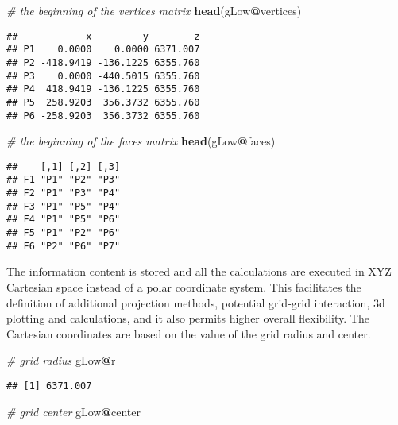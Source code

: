 \documentclass[]{article}
\newenvironment{Shaded}{\begin{snugshade}}{\end{snugshade}}
\newcommand{\KeywordTok}[1]{\textcolor[rgb]{0.13,0.29,0.53}{\textbf{#1}}}
\newcommand{\CommentTok}[1]{\textcolor[rgb]{0.56,0.35,0.01}{\textit{#1}}}
\newcommand{\OperatorTok}[1]{\textcolor[rgb]{0.81,0.36,0.00}{\textbf{#1}}}
\newcommand{\NormalTok}[1]{#1}
\begin{document}
\begin{Shaded}
\begin{Highlighting}[]
\CommentTok{# the beginning of the vertices matrix}
\KeywordTok{head}\NormalTok{(gLow}\OperatorTok{@}\NormalTok{vertices)}
\end{Highlighting}
\end{Shaded}

\begin{verbatim}
##            x         y        z
## P1    0.0000    0.0000 6371.007
## P2 -418.9419 -136.1225 6355.760
## P3    0.0000 -440.5015 6355.760
## P4  418.9419 -136.1225 6355.760
## P5  258.9203  356.3732 6355.760
## P6 -258.9203  356.3732 6355.760
\end{verbatim}

\begin{Shaded}
\begin{Highlighting}[]
\CommentTok{# the beginning of the faces matrix}
\KeywordTok{head}\NormalTok{(gLow}\OperatorTok{@}\NormalTok{faces)}
\end{Highlighting}
\end{Shaded}

\begin{verbatim}
##    [,1] [,2] [,3]
## F1 "P1" "P2" "P3"
## F2 "P1" "P3" "P4"
## F3 "P1" "P5" "P4"
## F4 "P1" "P5" "P6"
## F5 "P1" "P2" "P6"
## F6 "P2" "P6" "P7"
\end{verbatim}

The information content is stored and all the calculations are executed
in XYZ Cartesian space instead of a polar coordinate system. This
facilitates the definition of additional projection methods, potential
grid-grid interaction, 3d plotting and calculations, and it also permits
higher overall flexibility. The Cartesian coordinates are based on the
value of the grid radius and center.

\begin{Shaded}
\begin{Highlighting}[]
\CommentTok{# grid radius}
\NormalTok{gLow}\OperatorTok{@}\NormalTok{r}
\end{Highlighting}
\end{Shaded}

\begin{verbatim}
## [1] 6371.007
\end{verbatim}

\begin{Shaded}
\begin{Highlighting}[]
\CommentTok{# grid center}
\NormalTok{gLow}\OperatorTok{@}\NormalTok{center}
\end{Highlighting}
\end{Shaded}
\end{document}
